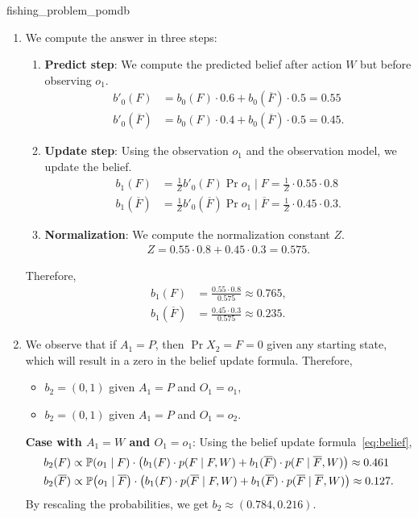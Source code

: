 \begin{solution}{fishing_problem_pomdb}
  \begin{enumerate}[beginpenalty=10000]
    \item We compute the answer in three steps: \begin{enumerate}
      \item \textbf{Predict step}: We compute the predicted belief after action $W$ but before observing $o_1$. \begin{align*}
        b'_0(F) &= b_0(F) \cdot 0.6 + b_0(\overline{F}) \cdot 0.5 = 0.55 \\
        b'_0(\overline{F}) &= b_0(F) \cdot 0.4 + b_0(\overline{F}) \cdot 0.5 = 0.45.
      \end{align*}
      \item \textbf{Update step}: Using the observation $o_1$ and the observation model, we update the belief. \begin{align*}
        b_1(F) &= \frac{1}{Z} b'_0(F) \Pr{o_1 \mid F} = \frac{1}{Z} \cdot 0.55 \cdot 0.8 \\
        b_1(\overline{F}) &= \frac{1}{Z} b'_0(\overline{F}) \Pr{o_1 \mid \overline{F}} = \frac{1}{Z} \cdot 0.45 \cdot 0.3.
      \end{align*}
      \item \textbf{Normalization}: We compute the normalization constant $Z$. \begin{align*}
        Z = 0.55 \cdot 0.8 + 0.45 \cdot 0.3 = 0.575.
      \end{align*}
    \end{enumerate}
    Therefore, \begin{align*}
      b_1(F) &= \frac{0.55 \cdot 0.8}{0.575} \approx 0.765, \\
      b_1(\overline{F}) &= \frac{0.45 \cdot 0.3}{0.575} \approx 0.235.
    \end{align*}

    \item We observe that if $A_1 = P$, then $\Pr{X_2 = F} = 0$ given any starting state, which will result in a zero in the belief update formula.
    Therefore, \begin{itemize}
      \item $b_2 = (0, 1)$ given $A_1 = P$ and $O_1 = o_1$,
      \item $b_2 = (0, 1)$ given $A_1 = P$ and $O_1 = o_2$.
    \end{itemize}

    \textbf{Case with $A_1 = W$ and $O_1 = o_1$}:
    Using the belief update formula~\eqref{eq:belief}, \begin{align*}
      b_2(F) &\propto \Pr{o_1 \mid F} \cdot \parentheses*{b_1(F) \cdot p(F \mid F, W) + b_1(\overline{F}) \cdot p(F \mid \overline{F}, W)} \approx 0.461 \\
      b_2(\overline{F}) &\propto \Pr{o_1 \mid \overline{F}} \cdot \parentheses*{b_1(F) \cdot p(\overline{F} \mid F, W) + b_1(\overline{F}) \cdot p(\overline{F} \mid \overline{F}, W)} \approx 0.127.
    \end{align*}
    By rescaling the probabilities, we get $b_2 \approx (0.784, 0.216)$.


\end{enumerate}
\end{solution}

